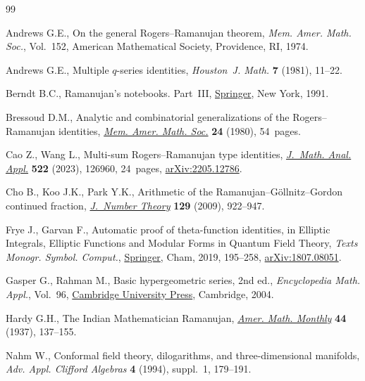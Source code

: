 \begin{thebibliography}{99}
\footnotesize\itemsep=0pt

Andrews G.E., On the general {R}ogers--{R}amanujan theorem, \textit{Mem. Amer.
 Math. Soc.}, Vol.~152, American Mathematical Society, Providence, RI, 1974.

Andrews G.E., Multiple {$q$}-series identities, \textit{Houston~J. Math.}
 \textbf{7} (1981), 11--22.

Berndt B.C., Ramanujan's notebooks. {P}art~{III},
 \href{https://doi.org/10.1007/978-1-4612-0965-2}{Springer}, New York, 1991.

Bressoud D.M., Analytic and combinatorial generalizations of the
 {R}ogers--{R}amanujan identities,
 \href{https://doi.org/10.1090/memo/0227}{\textit{Mem. Amer. Math. Soc.}}
 \textbf{24} (1980), 54~pages.

Cao Z., Wang L., Multi-sum {R}ogers--{R}amanujan type identities,
 \href{https://doi.org/10.1016/j.jmaa.2022.126960}{\textit{J.~Math. Anal.
 Appl.}} \textbf{522} (2023), 126960, 24~pages,
 \href{http://arxiv.org/abs/2205.12786}{arXiv:2205.12786}.

Cho B., Koo J.K., Park Y.K., Arithmetic of the
 {R}amanujan--{G}\"{o}llnitz--{G}ordon continued fraction,
 \href{https://doi.org/10.1016/j.jnt.2008.09.018}{\textit{J.~Number Theory}}
 \textbf{129} (2009), 922--947.

Frye J., Garvan F., Automatic proof of theta-function identities, in Elliptic Integrals, Elliptic Functions and Modular Forms in Quantum Field Theory,
 \textit{Texts Monogr. Symbol. Comput.},
 \href{https://doi.org/10.1007/978-3-030-04480-0_10}{Springer}, Cham, 2019,
 195--258, \href{http://arxiv.org/abs/1807.08051}{arXiv:1807.08051}.

Gasper G., Rahman M., Basic hypergeometric series, 2nd ed., \textit{Encyclopedia Math.
 Appl.}, Vol.~96,
 \href{https://doi.org/10.1017/CBO9780511526251}{Cambridge University Press},
 Cambridge, 2004.

Hardy G.H., The {I}ndian {M}athematician {R}amanujan,
 \href{https://doi.org/10.2307/2301659}{\textit{Amer. Math. Monthly}}
 \textbf{44} (1937), 137--155.

Nahm W., Conformal field theory, dilogarithms, and three-dimensional manifolds,
 \textit{Adv. Appl. Clifford Algebras} \textbf{4} (1994), suppl.~1, 179--191.


\end{thebibliography}
